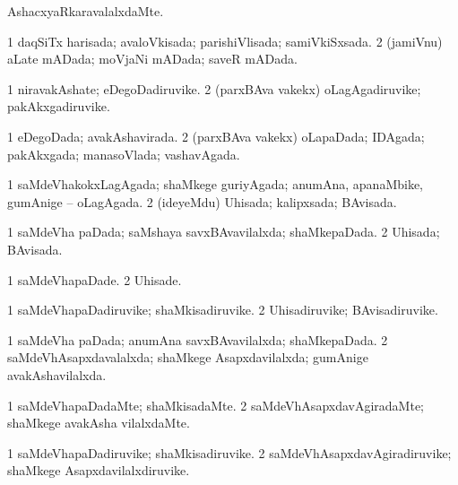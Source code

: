 \bentry
{} 
\gl{\kirxvi}
\expl{}
\bmng
AshacxyaRkaravalalxdaMte. 
\emng
\eentry

\bentry
{} 
\gl{\gu}
\expl{}
\bmng
\bnum
\num{1} daqSiTx harisada; avaloVkisada; parishiVlisada; samiVkiSxsada. 
\num{2} (jamiVnu) aLate mADada; moVjaNi mADada; saveR mADada. 
\enum
\emng
\eentry

\bentry
{} 
\gl{\nA}
\expl{}
\bmng
\bnum
\num{1} niravakAshate; eDegoDadiruvike. 
\num{2} (parxBAva \mo vakekx) oLagAgadiruvike; pakAkxgadiruvike. 
\enum
\emng
\eentry

\bentry
{} 
\gl{\gu}
\expl{}
\bmng
\bnum
\num{1} eDegoDada; avakAshavirada. 
\num{2} (parxBAva \mo vakekx) oLapaDada; IDAgada; pakAkxgada; manasoVlada; vashavAgada. 
\enum
\emng
\eentry

\bentry
{} 
\gl{\gu}
\expl{}
\bmng
\bnum
\num{1} saMdeVhakokxLagAgada; shaMkege guriyAgada; anumAna, apanaMbike, gumAnige -- oLagAgada. 
\num{2} (ideyeMdu) Uhisada; kalipxsada; BAvisada. 
\enum
\emng
\eentry

\bentry
{} 
\gl{\gu}
\expl{}
\bmng
\bnum
\num{1} saMdeVha paDada; saMshaya savxBAvavilalxda; shaMkepaDada. 
\num{2} Uhisada; BAvisada. 
\enum
\emng
\eentry

\bentry
{} 
\gl{\kirxvi}
\bmng
\bnum
\num{1} saMdeVhapaDade. 
\num{2} Uhisade. 
\enum
\emng
\eentry

\bentry
{} 
\gl{\nA}
\expl{}
\bmng
\bnum
\num{1} saMdeVhapaDadiruvike; shaMkisadiruvike. 
\num{2} Uhisadiruvike; BAvisadiruvike. 
\enum
\emng
\eentry

\bentry
{} 
\gl{\gu}
\expl{}
\bmng
\bnum
\num{1} saMdeVha paDada; anumAna savxBAvavilalxda; shaMkepaDada. 
\num{2} saMdeVhAsapxdavalalxda; shaMkege Asapxdavilalxda; gumAnige avakAshavilalxda. 
\enum
\emng
\eentry

\bentry
{} 
\gl{\kirxvi}
\bmng
\bnum
\num{1} saMdeVhapaDadaMte; shaMkisadaMte. 
\num{2} saMdeVhAsapxdavAgiradaMte; shaMkege avakAsha vilalxdaMte. 
\enum
\emng
\eentry

\bentry
{} 
\gl{\nA}
\expl{}
\bmng
\bnum
\num{1} saMdeVhapaDadiruvike; shaMkisadiruvike. 
\num{2} saMdeVhAsapxdavAgiradiruvike; shaMkege Asapxdavilalxdiruvike. 
\enum
\emng
\eentry

